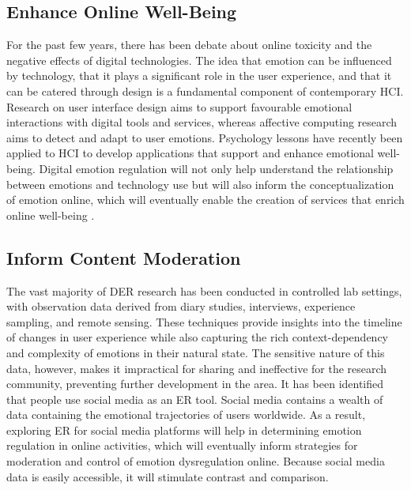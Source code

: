 \documentclass[lettersize,journal]{IEEEtran}
\begin{document}
\subsection{Enhance Online Well-Being}
For the past few years, there has been debate about online toxicity and the negative effects of digital technologies. The idea that emotion can be influenced by technology, that it plays a significant role in the user experience, and that it can be catered through design is a fundamental component of contemporary HCI. Research on user interface design aims to support favourable emotional interactions with digital tools and services, whereas affective computing research aims to detect and adapt to user emotions. Psychology lessons have recently been applied to HCI to develop applications that support and enhance emotional well-being. Digital emotion regulation will not only help understand the relationship between emotions and technology use but will also inform the conceptualization of emotion online, which will eventually enable the creation of services that enrich online well-being \cite{wadley2022future}.
\subsection{Inform Content Moderation}
The vast majority of DER research has been conducted in controlled lab settings, with observation data derived from diary studies, interviews, experience sampling, and remote sensing. These techniques provide insights into the timeline of changes in user experience while also capturing the rich context-dependency and complexity of emotions in their natural state. The sensitive nature of this data, however, makes it impractical for sharing and ineffective for the research community, preventing further development in the area. It has been identified that people use social media as an ER tool. Social media contains a wealth of data containing the emotional trajectories of users worldwide. As a result, exploring ER for social media platforms will help in determining emotion regulation in online activities, which will eventually inform strategies for moderation and control of emotion dysregulation online. Because social media data is easily accessible, it will stimulate contrast and comparison.
\end{document}

